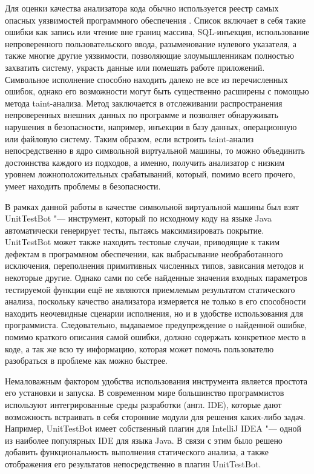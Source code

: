 
Для оценки качества анализатора кода обычно используется реестр самых опасных уязвимостей программного обеспечения \cite{cwe}. Список включает в себя такие ошибки как запись или чтение вне границ массива, SQL-инъекция, использование непроверенного пользовательского ввода, разыменование нулевого указателя, а также многие другие уязвимости, позволяющие злоумышленникам полностью захватить систему, украсть данные или помешать работе приложений. Символьное исполнение способно находить далеко не все из перечисленных ошибок, однако его возможности могут быть существенно расширены с помощью метода taint-анализа. Метод заключается в отслеживании распространения непроверенных внешних данных по программе и позволяет обнаруживать нарушения в безопасности, например, инъекции в базу данных, операционную или файловую систему. Таким образом, если встроить taint-анализ непосредственно в ядро символьной виртуальной машины, то можно объединить достоинства каждого из подходов, а именно, получить анализатор с низким уровнем ложноположительных срабатываний, который, помимо всего прочего, умеет находить проблемы в безопасности.

В рамках данной работы в качестве символьной виртуальной машины был взят UnitTestBot \cite{utbot} "--- инструмент, который по исходному коду на языке Java автоматически генерирует тесты, пытаясь максимизировать покрытие. UnitTestBot может также находить тестовые случаи, приводящие к таким дефектам в программном обеспечении, как выбрасывание необработанного исключения, переполнения примитивных численных типов, зависания методов и некоторые другие. Однако сами по себе найденные значения входных параметров тестируемой функции ещё не являются приемлемым результатом статического анализа, поскольку качество анализатора измеряется не только в его способности находить неочевидные сценарии исполнения, но и в удобстве использования для программиста. Следовательно, выдаваемое предупреждение о найденной ошибке, помимо краткого описания самой ошибки, должно содержать конкретное место в коде, а так же всю ту информацию, которая может помочь пользователю разобраться в проблеме как можно быстрее.

Немаловажным фактором удобства использования инструмента является простота его установки и запуска. В современном мире большинство программистов используют интегрированные среды разработки (англ. IDE), которые дают возможность встраивать в себя сторонние модули для решения каких-либо задач. Например, UnitTestBot имеет собственный плагин для IntelliJ IDEA \cite{idea} "--- одной из наиболее популярных IDE для языка Java. В связи с этим было решено добавить функциональность выполнения статического анализа, а также отображения его результатов непосредственно в плагин UnitTestBot.

